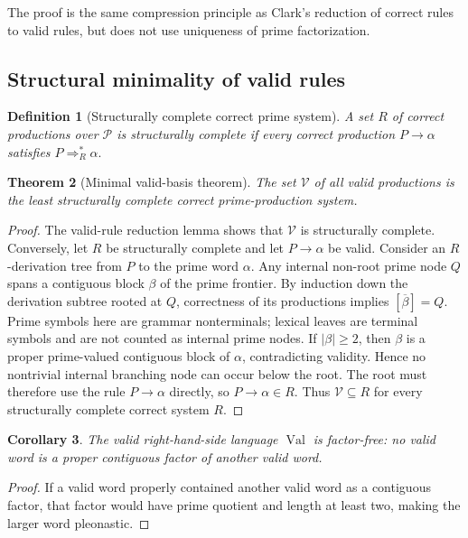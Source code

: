 \documentclass[11pt,a4paper]{article}
\newtheorem{theorem}{Theorem}[section]
\newtheorem{corollary}[theorem]{Corollary}
\newtheorem{definition}[theorem]{Definition}
\newcommand{\Pcal}{\mathcal P}
\newcommand{\Vcal}{\mathcal V}
\newcommand{\Val}{\operatorname{Val}}
\begin{document}
The proof is the same compression principle as Clark's reduction of correct rules to valid rules, but does not use uniqueness of prime factorization.

\subsection{Structural minimality of valid rules}

\begin{definition}[Structurally complete correct prime system]
A set $R$ of correct productions over $\Pcal$ is \emph{structurally complete} if every correct production $P\to\alpha$ satisfies
\(P\Rightarrow_R^*\alpha.\)
\end{definition}

\begin{theorem}[Minimal valid-basis theorem]
\label{thm:minimal-valid-basis}
The set $\Vcal$ of all valid productions is the least structurally complete correct prime-production system.
\end{theorem}

\begin{proof}
The valid-rule reduction lemma shows that $\Vcal$ is structurally complete.  Conversely, let $R$ be structurally complete and let $P\to\alpha$ be valid.  Consider an $R$-derivation tree from $P$ to the prime word $\alpha$.  Any internal non-root prime node $Q$ spans a contiguous block $\beta$ of the prime frontier.  By induction down the derivation subtree rooted at $Q$, correctness of its productions implies $[\overline\beta]=Q$.  Prime symbols here are grammar nonterminals; lexical leaves are terminal symbols and are not counted as internal prime nodes.  If $|\beta|\ge2$, then $\beta$ is a proper prime-valued contiguous block of $\alpha$, contradicting validity.  Hence no nontrivial internal branching node can occur below the root.  The root must therefore use the rule $P\to\alpha$ directly, so $P\to\alpha\in R$.  Thus $\Vcal\subseteq R$ for every structurally complete correct system $R$.
\end{proof}

\begin{corollary}
The valid right-hand-side language $\Val$ is factor-free: no valid word is a proper contiguous factor of another valid word.
\end{corollary}

\begin{proof}
If a valid word properly contained another valid word as a contiguous factor, that factor would have prime quotient and length at least two, making the larger word pleonastic.
\end{proof}
\end{document}
